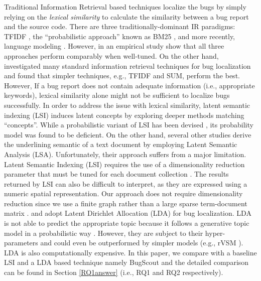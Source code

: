 \documentclass[sigconf,review,anonymous]{acmart}
\begin{document}
Traditional Information Retrieval based techniques localize the bugs by simply relying on the \emph{lexical similarity} to calculate the similarity between a bug report and the source code. 
There are three traditionally-dominant IR paradigms: TFIDF \cite{Salton}, the “probabilistic approach” known as BM25 \cite{Robertson}, and more recently, language modeling \cite{Ponte}. However, in an empirical study \citet{Fang} show that all three approaches perform comparably when well-tuned. On the other hand, \citet{Rao} investigated many standard information retrieval techniques for bug localization and found that simpler techniques, e.g., TFIDF and SUM, perform the best. However, If a bug report does not contain adequate information (i.e., appropriate keywords), lexical similarity alone might not be sufficient to localize bugs successfully. In order to address the issue with lexical similarity, 
latent semantic indexing (LSI) induces latent concepts by exploring deeper methods matching “concepts”. While a probabilistic variant of LSI has been devised \cite{Hofmann}, its probability model was found to be deficient. On the other hand, several other studies \cite{Maletic, MarcusMaletic,irmarcus} derive the underlining semantic of a text document by employing Latent Semantic Analysis (LSA).
Unfortunately, their approach suffers from a major limitation.
Latent Semantic Indexing (LSI) requires the use of a dimensionality reduction parameter that must be tuned for each document collection \cite{Kontostathis}.
The results returned by LSI can also be difficult to interpret, as
they are expressed using a numeric spatial representation.
Our approach does not require dimensionality reduction since we use a finite graph rather than a large sparse term-document matrix \cite{MarcusLSI,MarcusMaletic}.
\citet{LukinsBL} and \cite{Nguyen} adopt Latent Dirichlet Allocation (LDA) for bug localization. LDA is not able to predict the appropriate topic because it follows a generative topic model in a probabilistic way \cite{Lukins}. However, they are subject to their hyper-parameters and could even be outperformed by simpler models (e.g., rVSM \cite{Jian}).  
LDA is also computationally expensive. In this paper, we compare with a baseline LSI \cite{MarcusLSI} and a LDA based technique namely BugScout \cite{Nguyen} and the detailed comparison can be found in Section \ref{RQ1answer} (i.e., RQ1 and RQ2 respectively).
\end{document}
